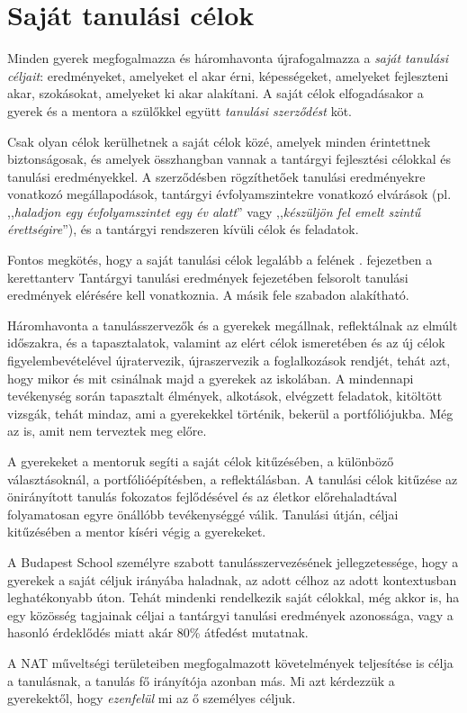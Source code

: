\section{Saját tanulási célok}
\label{sec:tanulasi_celok}

Minden gyerek megfogalmazza és háromhavonta újrafogalmazza a \emph{saját
      tanulási céljait}: eredményeket, amelyeket el akar érni, képességeket,
amelyeket fejleszteni akar, szokásokat, amelyeket ki akar alakítani. A saját
célok elfogadásakor a gyerek és a mentora a szülőkkel együtt \emph{tanulási
      szerződést} köt.

Csak olyan célok kerülhetnek a saját célok közé, amelyek
minden érintettnek biztonságosak, és amelyek összhangban vannak a tantárgyi
fejlesztési célokkal és tanulási eredményekkel. A szerződésben rögzíthetőek
tanulási eredményekre
vonatkozó megállapodások,
tantárgyi évfolyamszintekre vonatkozó elvárások (pl. ,,\emph{haladjon egy
      évfolyamszintet egy év alatt}'' vagy ,,\emph{készüljön fel emelt szintű
      érettségire}''), és a tantárgyi rendszeren kívüli célok és
feladatok.

Fontos megkötés, hogy a saját tanulási célok legalább a felének
\ifkerettanterv
      . fejezetben
\else
      a kerettanterv Tantárgyi tanulási eredmények fejezetében
\fi
felsorolt tanulási eredmények elérésére kell vonatkoznia. A másik
fele szabadon alakítható.

Háromhavonta a tanulásszervezők és a gyerekek megállnak, reflektálnak az elmúlt
időszakra, és a tapasztalatok, valamint az elért célok ismeretében és az új
célok figyelembevételével újratervezik, újraszervezik a foglalkozások rendjét,
tehát azt, hogy mikor és mit csinálnak majd a gyerekek az iskolában.
A mindennapi tevékenység során tapasztalt élmények, alkotások, elvégzett
feladatok, kitöltött vizsgák, tehát mindaz, ami a gyerekekkel történik, bekerül
a portfóliójukba. Még az is, amit nem terveztek meg előre.

A gyerekeket a mentoruk segíti a saját célok kitűzésében, a különböző
választásoknál, a portfólióépítésben, a reflektálásban. A tanulási célok
kitűzése az önirányított tanulás fokozatos fejlődésével és az életkor
előrehaladtával folyamatosan egyre önállóbb tevékenységgé válik. Tanulási
útján, céljai kitűzésében a mentor kíséri végig a gyerekeket.

A Budapest School személyre szabott tanulásszervezésének jellegzetessége, hogy
a gyerekek a saját céljuk irányába haladnak, az adott célhoz az adott
kontextusban leghatékonyabb úton. Tehát mindenki rendelkezik saját célokkal,
még akkor is, ha egy közösség tagjainak céljai a tantárgyi tanulási eredmények
azonossága, vagy a hasonló érdeklődés miatt akár  80\% átfedést mutatnak.

A NAT műveltségi területeiben megfogalmazott követelmények teljesítése is célja
a tanulásnak, a tanulás fő irányítója azonban más. Mi azt kérdezzük a
gyerekektől, hogy \emph{ezenfelül} mi az ő személyes céljuk.